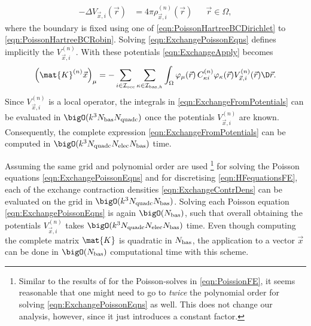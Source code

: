 \begin{equation}
\label{eqn:ExchangePoissonEqns}
\begin{aligned}
	- \Delta V_{\vec{x}, i}(\vec{r}) &= 4 \pi \rho_{\vec{x},i}^{(n)}(\vec{r})
		&& \vec{r} \in \Omega,
\end{aligned}
\end{equation}
where the boundary is fixed using one of \eqref{eqn:PoissonHartreeBCDirichlet}
to \eqref{eqn:PoissonHartreeBCRobin}.
Solving \eqref{eqn:ExchangePoissonEqns} defines
implicitly the  $V^{(n)}_{\vec{x}, i}$.
With these potentials \eqref{eqn:ExchangeApply} becomes
\begin{equation}
	\left( \mat{K}^{(n)} \vec{x}  \right)_\mu
	= -\sum_{i\in\Iocc} \sum_{\kappa\in\Ibash}
		\int_\Omega
		\varphi_\mu(\vec{r}) \, C^{(n)}_{\kappa i} \varphi_\kappa(\vec{r})
		V^{(n)}_{\vec{x}, i}(\vec{r}) \D \vec{r}.
	\label{eqn:ExchangeFromPotentials}
\end{equation}
Since $V^{(n)}_{\vec{x}, i}$ is a local operator,
the integrals in \eqref{eqn:ExchangeFromPotentials}
can be evaluated in $\bigO(k^3 \Nbas \Nquadc)$
once the potentials $V^{(n)}_{\vec{x}, i}$ are known.
Consequently, the complete expression \eqref{eqn:ExchangeFromPotentials}
can be computed in $\bigO(k^3 \Nquadc \Nelec \Nbas)$ time.

Assuming the same grid and polynomial order are used%
\footnote{Similar to the results of \cite{Davydov2015} for
the Poisson-solves in \eqref{eqn:PoissionFE},
it seems reasonable that one might need to go to \emph{twice}
the polynomial order for solving \eqref{eqn:ExchangePoissonEqns} as well.
This does not change our analysis, however,
since it just introduces a constant factor.}
for solving the Poisson equations \eqref{eqn:ExchangePoissonEqns}
and for discretising \eqref{eqn:HFequationsFE},
each of the exchange contraction densities
\eqref{eqn:ExchangeContrDens}
can be evaluated on the grid in $\bigO(k^3 \Nquadc \Nbas)$.
Solving each Poisson equation \eqref{eqn:ExchangePoissonEqns}
is again $\bigO(\Nbas)$,
such that overall obtaining the potentials $V^{(n)}_{\vec{x}, i}$
takes $\bigO(k^3 \Nquadc \Nelec \Nbas)$ time.
Even though computing the complete matrix $\mat{K}$ is quadratic
in $N_\text{bas}$,
the application to a vector $\vec{x}$
can be done in $\bigO(\Nbas)$ computational time
with this scheme.

